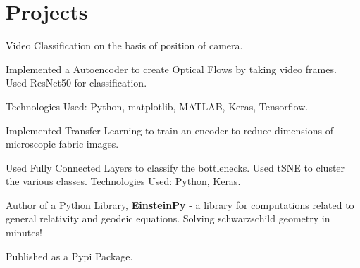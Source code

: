 \documentclass[a4paper]{deedy-resume-openfont}
\begin{document}
\begin{minipage}[t]{0.66\textwidth}

\section{Projects}

\begin{tightemize}
\item Video Classification on the basis of position of camera. \item Implemented a Autoencoder to create Optical Flows by taking video frames. Used ResNet50 for classification.
\item Technologies Used: Python, matplotlib, MATLAB, Keras, Tensorflow.
\end{tightemize}
\sectionsep

\begin{tightemize}
\item Implemented Transfer Learning to train an encoder to reduce dimensions of microscopic fabric images. \item Used Fully Connected Layers to classify the bottlenecks. Used tSNE to cluster the various classes. Technologies Used: Python, Keras.
\end{tightemize}



\begin{tightemize}
\item Author of a Python Library, \textbf{\href{http://github.com/einsteinpy/einsteinpy}{EinsteinPy}} - a library for computations related to general relativity and geodeic equations. Solving schwarzschild geometry in minutes! 
\item Published as a Pypi Package.
\end{tightemize}
\sectionsep


\end{minipage}
\end{document}
